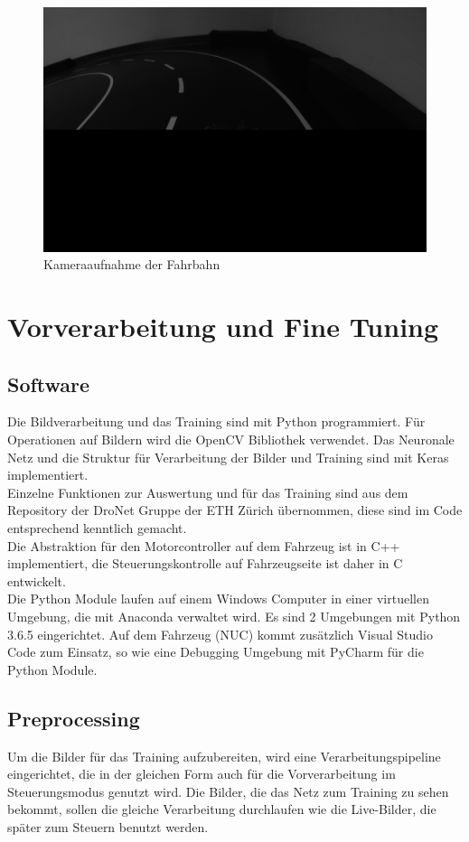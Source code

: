 \begin{figure}[h]
	\centering
	\includegraphics[scale=0.4]{figures/Rohbild.png}
	\caption{Kameraaufnahme der Fahrbahn}
	\label{img:rohbild}
\end{figure}


\section{Vorverarbeitung und Fine Tuning}

\subsection{Software}
Die Bildverarbeitung und das Training sind mit Python programmiert. Für Operationen auf Bildern wird die OpenCV Bibliothek verwendet. Das Neuronale Netz und die Struktur für Verarbeitung der Bilder und Training sind mit Keras implementiert.\\
Einzelne Funktionen zur Auswertung und für das Training sind aus dem Repository der DroNet Gruppe der ETH Zürich übernommen, diese sind im Code entsprechend kenntlich gemacht.\\
Die Abstraktion für den Motorcontroller auf dem Fahrzeug ist in C++ implementiert, die Steuerungskontrolle auf Fahrzeugseite ist daher in C entwickelt.\\
Die Python Module laufen auf einem Windows Computer in einer virtuellen Umgebung, die mit Anaconda verwaltet wird. Es sind 2 Umgebungen mit Python 3.6.5 eingerichtet. Auf dem Fahrzeug (NUC) kommt zusätzlich Visual Studio Code zum Einsatz, so wie eine Debugging Umgebung mit PyCharm für die Python Module.

\subsection{Preprocessing}
Um die Bilder für das Training aufzubereiten, wird eine Verarbeitungspipeline eingerichtet, die in der gleichen Form auch für die Vorverarbeitung im Steuerungsmodus genutzt wird. Die Bilder, die das Netz zum Training zu \glqq sehen \grqq{} bekommt, sollen die gleiche Verarbeitung durchlaufen wie die Live-Bilder, die später zum Steuern benutzt werden.


